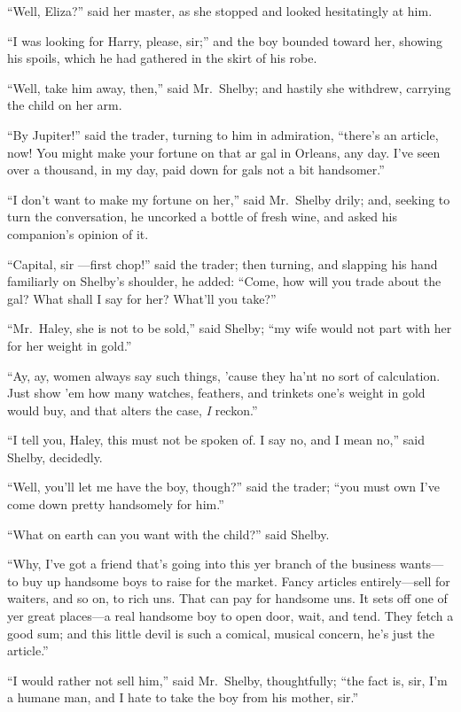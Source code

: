 ``Well, Eliza?'' said her master, as she stopped and looked hesitatingly at him.

``I was looking for Harry, please, sir;'' and the boy bounded toward her,
showing his spoils, which he had gathered in the skirt of his robe.

``Well, take him away, then,'' said Mr.\ Shelby; and hastily she withdrew,
carrying the child on her arm.

``By Jupiter!'' said the trader, turning to him in admiration, ``there's an
article, now! You might make your fortune on that ar gal in Orleans, any day.
I've seen over a thousand, in my day, paid down for gals not a bit handsomer.''

``I don't want to make my fortune on her,'' said Mr.\ Shelby drily; and, seeking
to turn the conversation, he uncorked a bottle of fresh wine, and asked his
companion's opinion of it.

``Capital, sir ---first chop!'' said the trader; then turning, and slapping his
hand familiarly on Shelby's shoulder, he added: ``Come, how will you trade about
the gal? What shall I say for her? What'll you take?''

``Mr.\ Haley, she is not to be sold,'' said Shelby; ``my wife would not part
with her for her weight in gold.''

``Ay, ay, women always say such things, 'cause they ha'nt no sort of
calculation. Just show 'em how many watches, feathers, and trinkets one's weight
in gold would buy, and that alters the case, \emph{I} reckon.''

``I tell you, Haley, this must not be spoken of. I say no, and I mean no,'' said
Shelby, decidedly.

``Well, you'll let me have the boy, though?'' said the trader; ``you must own
I've come down pretty handsomely for him.''

``What on earth can you want with the child?'' said Shelby.

``Why, I've got a friend that's going into this yer branch of the business
wants---to buy up handsome boys to raise for the market. Fancy articles
entirely---sell for waiters, and so on, to rich uns. That can pay for handsome
uns. It sets off one of yer great places---a real handsome boy to open door,
wait, and tend. They fetch a good sum; and this little devil is such a comical,
musical concern, he's just the article.''

``I would rather not sell him,'' said Mr.\ Shelby, thoughtfully; ``the fact is,
sir, I'm a humane man, and I hate to take the boy from his mother, sir.''

